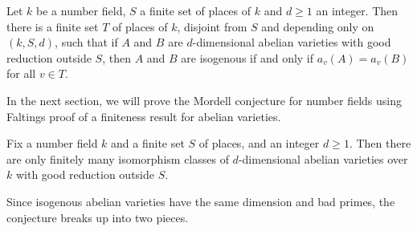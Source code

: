 \begin{corollary}\label{lem:ab-var-fin-data}
Let $k$ be a number field, $S$ a finite set of places of $k$ and 
$d\geqslant 1$ an integer. Then there is a finite set $T$ of places of $k$, 
disjoint from $S$ and depending only on $(k,S,d)$, such that if $A$ and $B$ 
are $d$-dimensional abelian varieties with good reduction outside $S$, then 
$A$ and $B$ are isogenous if and only if $a_v(A)=a_v(B)$ for all $v\in T$. 
\end{corollary}

In the next section, we will prove the Mordell conjecture for number fields 
using Faltings proof of a finiteness result for abelian varieties. 

\begin{conjecture}
Fix a number field $k$ and a finite set $S$ of places, and an integer 
$d\geqslant 1$. Then there are only finitely many isomorphism classes of 
$d$-dimensional abelian varieties over $k$ with good reduction outside $S$. 
\end{conjecture}

Since isogenous abelian varieties have the same dimension and bad primes, 
the conjecture breaks up into two pieces. 

